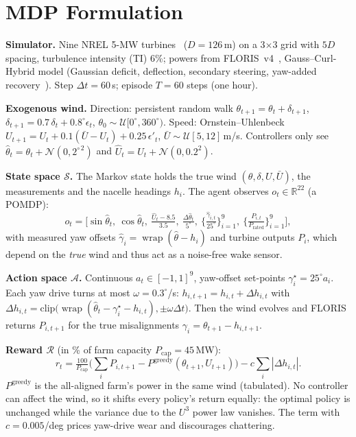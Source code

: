 \documentclass[conference,10pt]{IEEEtran}
\newcommand{\wrap}{\operatorname{wrap}}
\begin{document}
\section{MDP Formulation}
\textbf{Simulator.} Nine NREL 5-MW turbines~\cite{jonkman2009} ($D=126$\,m) on a 3$\times$3 grid with $5D$
spacing, turbulence intensity (TI) 6\%; powers from FLORIS~v4~\cite{floris}, Gauss--Curl-Hybrid model
(Gaussian deficit, deflection, secondary steering, yaw-added recovery~\cite{king2021}). Step $\Delta t=60$\,s;
episode $T=60$ steps (one hour).

\textbf{Exogenous wind.} Direction: persistent random walk $\theta_{t+1}=\theta_t+\delta_{t+1}$,
$\delta_{t+1}=0.7\,\delta_t+0.8^\circ\epsilon_t$, $\theta_0\sim\mathcal U[0^\circ,360^\circ)$. Speed:
Ornstein--Uhlenbeck $U_{t+1}=U_t+0.1(\bar U-U_t)+0.25\,\epsilon'_t$, $\bar U\sim\mathcal U[5,12]$\,m/s.
Controllers only see $\hat\theta_t=\theta_t+\mathcal N(0,2^{\circ\,2})$ and $\hat U_t=U_t+\mathcal N(0,0.2^2)$.

\textbf{State space $\mathcal S$.} The Markov state holds the true wind $(\theta,\delta,U,\bar U)$, the
measurements and the nacelle headings $h_i$. The agent observes $o_t\in\mathbb R^{22}$ (a POMDP):
\begin{equation*}
o_t=\Big[\sin\hat\theta_t,\ \cos\hat\theta_t,\ \tfrac{\hat U_t-8.5}{3.5},\ \tfrac{\Delta\hat\theta_t}{5^\circ},\
\big\{\tfrac{\hat\gamma_{i,t}}{25^\circ}\big\}_{i=1}^{9},\ \big\{\tfrac{P_{i,t}}{P_\mathrm{rated}}\big\}_{i=1}^{9}\Big],
\end{equation*}
with measured yaw offsets $\hat\gamma_i=\wrap(\hat\theta-h_i)$ and turbine outputs $P_i$, which depend on
the \emph{true} wind and thus act as a noise-free wake sensor.

\textbf{Action space $\mathcal A$.} Continuous $a_t\in[-1,1]^9$, yaw-offset set-points $\gamma^\star_i=25^\circ a_i$.
Each yaw drive turns at most $\omega=0.3^\circ$/s: $h_{i,t+1}=h_{i,t}+\Delta h_{i,t}$ with
$\Delta h_{i,t}=\mathrm{clip}\big(\wrap(\hat\theta_t-\gamma^\star_i-h_{i,t}),\pm\omega\Delta t\big)$. Then the
wind evolves and FLORIS returns $P_{i,t+1}$ for the true misalignments $\gamma_i=\theta_{t+1}-h_{i,t+1}$.

\textbf{Reward $\mathcal R$} (in \% of farm capacity $P_\mathrm{cap}=45$\,MW):
\begin{equation}
r_t=\tfrac{100}{P_\mathrm{cap}}\Big(\textstyle\sum_{i}P_{i,t+1}-P^\mathrm{greedy}(\theta_{t+1},U_{t+1})\Big)-c\sum_i|\Delta h_{i,t}|.
\label{eq:reward}
\end{equation}
$P^\mathrm{greedy}$ is the all-aligned farm's power in the same wind (tabulated). No controller can affect the
wind, so it shifts every policy's return equally: the optimal policy is unchanged while the variance due to
the $U^3$ power law vanishes. The term with $c=0.005$/deg prices yaw-drive wear and discourages chattering.
\end{document}
